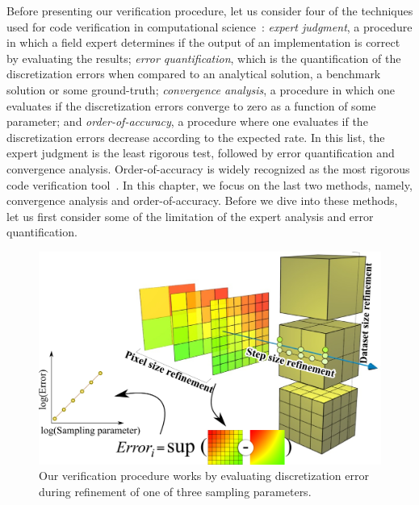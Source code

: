 Before presenting our verification procedure, let us consider four of
the techniques used for code verification in computational
science~\cite{Roy2005}: \emph{expert judgment}, a procedure in which a
field expert determines if the output of an implementation is correct
by evaluating the results; \emph{error quantification}, which is the
quantification of the discretization errors when compared to an
analytical solution, a benchmark solution or some ground-truth;
\emph{convergence analysis}, a procedure in which one evaluates if the
discretization errors converge to zero as a function of some
parameter; and \emph{order-of-accuracy}, a procedure where one
evaluates if the discretization errors decrease according to the
expected rate. In this list, the expert judgment is the least rigorous
test, followed by error quantification and convergence analysis. 
Order-of-accuracy is widely recognized as the most rigorous code
verification tool~\cite{babuska04, KnuppSalari02, roach98,
  Roy2005}. In this chapter, we focus on the last two methods, namely,
convergence analysis and order-of-accuracy. Before we dive into these
methods, let us first consider some of the limitation of the expert
analysis and error quantification.
\begin{figure}[b]
\centering
\includegraphics[width=0.8\linewidth]{chapter5/figures/refinement.png}
\caption{\label{fig:verification-procedure} Our verification procedure
  works by evaluating discretization error during refinement
  of one of three sampling parameters. }
\end{figure}

